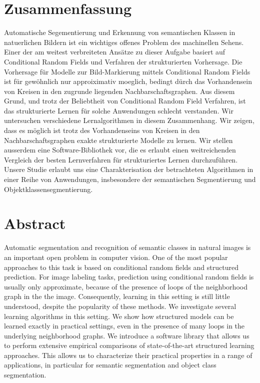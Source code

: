 \documentclass[12pt,toc=bibnumbered, a4paper,twoside,DIV=11,BCOR=.5cm]{scrbook}
\begin{document}
\chapter*{Zusammenfassung}
Automatische Segementierung und Erkennung von semantischen Klassen in
natuerlichen Bildern ist ein wichtiges offenes Problem des machinellen Sehens.
Einer der am weitest verbreiteten Ans\"atze zu dieser Aufgabe basiert auf
Conditional Random Fields und Verfahren der strukturierten Vorhersage. Die
Vorhersage f\"ur Modelle zur Bild-Markierung mittels Conditional Random Fields
ist f\"ur gew\"ohnlich nur approiximativ moeglich, bedingt d\"urch das
Vorhandensein von Kreisen in den zugrunde liegenden Nachbarschaftsgraphen.
Aus diesem Grund, und trotz der Beliebtheit von Conditional Random Field
Verfahren, ist das strukturierte Lernen f\"ur solche Anwendungen schlecht
verstanden.
%
Wir untersuchen verschiedene Lernalgorithmen in diesem
Zusammenhang. Wir zeigen, dass es m\"oglich ist trotz des Vorhandenseins von
Kreisen in den Nachbarschaftsgraphen exakte strukturierte Modelle zu lernen.
Wir stellen ausserdem eine Software-Bibliothek vor, die es erlaubt einen
weitreichenden Vergleich der besten Lernverfahren f\"ur strukturiertes Lernen
durchzuf\"uhren.
Unsere Studie erlaubt uns eine Charakterisation der betrachteten Algorithmen
in einer Reihe von Anwendungen, insbesondere der semantischen Segmentierung und
Objektklassensegmentierung.

\chapter*{Abstract}
Automatic segmentation and recognition of semantic classes in natural images is an important open problem in computer vision.
One of the most popular approaches to this task is based on conditional random fields and structured prediction.
For image labeling tasks, prediction using conditional random fields is usually only approximate, because of the presence
of loops of the neighborhood graph in the the image. Consequently, learning in
this setting is still little understood, despite the popularity of these
methods.
%
We investigate several learning algorithms in this setting. We show
how structured models can be learned exactly in practical settings, even in the
presence of many loops in the underlying neighborhood graphs.  We introduce a
software library that allows us to perform extensive empirical comparisons of
state-of-the-art structured learning approaches. This allows us to characterize
their practical properties in a range of applications, in particular for semantic segmentation
and object class segmentation.
\end{document}

